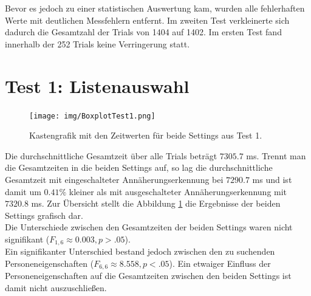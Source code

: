 \documentclass[12pt,bibliography=totocnumbered,listof=totocnumbered,abstracton]{scrreprt}
\begin{document}
Bevor es jedoch zu einer statistischen Auswertung kam, wurden alle fehlerhaften Werte mit deutlichen Messfehlern entfernt. Im zweiten Test verkleinerte sich dadurch die Gesamtzahl der Trials von 1404 auf 1402. Im ersten Test fand innerhalb der 252 Trials keine Verringerung statt. 

\section{Test 1: Listenauswahl}
\begin{figure}
\centering
\texttt{[image: img/BoxplotTest1.png]}
\caption{Kastengrafik mit den Zeitwerten für beide Settings aus Test 1.}
\label{ergebnistest1}
\end{figure}
Die durchschnittliche Gesamtzeit über alle Trials beträgt $7305.7$ ms. Trennt man die Gesamtzeiten in die beiden Settings auf, so lag die durchschnittliche Gesamtzeit mit eingeschalteter Annäherungserkennung bei $7290.7$ ms und ist damit um $0.41\%$ kleiner als mit ausgeschalteter Annäherungserkennung mit $7320.8$ ms. Zur Übersicht stellt die Abbildung \ref{ergebnistest1} die Ergebnisse der beiden Settings grafisch dar.\\
Die Unterschiede zwischen den Gesamtzeiten der beiden Settings waren nicht signifikant ($F_{1,6}\approx 0.003, p > .05$).\\
Ein signifikanter Unterschied bestand jedoch zwischen den zu suchenden Personeneigenschaften ($F_{6,6}\approx 8.558, p < .05$). Ein etwaiger Einfluss der Personeneigenschaften auf die Gesamtzeiten zwischen den beiden Settings ist damit nicht auszuschließen.
\end{document}
